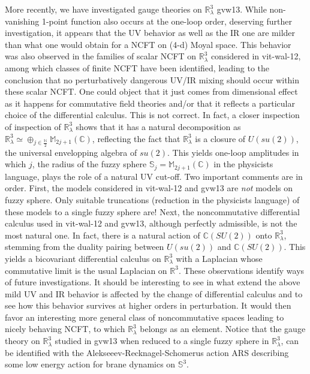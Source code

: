 \documentclass[10pt]{book}
\theoremstyle{break}
\begin{document}
More recently, we have investigated gauge theories on $\mathbb{R}^3_\lambda$ {gvw13}. While non-vanishing 1-point function also occurs at the one-loop order, deserving further investigation, it appears that the UV behavior as well as the IR one are milder than what one would obtain for a NCFT on (4-d) Moyal space. This behavior was also observed in the families of scalar NCFT on $\mathbb{R}^3_\lambda$ considered in {vit-wal-12}, among which classes of finite NCFT have been identified, leading to the conclusion that no perturbatively dangerous UV/IR mixing should occur within these scalar NCFT. One could object that it just comes from dimensional effect as it happens for commutative field theories and/or that it reflects a particular choice of the differential calculus. This is not correct. In fact, a closer inspection of inspection of $\mathbb{R}^3_\lambda$ shows that it has a natural decomposition as $\mathbb{R}^3_\lambda\simeq\oplus_{j\in\frac{\mathbb{N}}{2}}\mathbb{M}_{2j+1}(\mathbb{C})$, 
reflecting the fact that $\mathbb{R}^3_\lambda$  is a closure of $U(su(2))$, the universal envelopping algebra of $su(2)$. This yields one-loop amplitudes in which $j$, the radius of the fuzzy sphere $\mathbb{S}_j=\mathbb{M}_{2j+1}(\mathbb{C})$ in the physicists language, plays the role of a natural UV cut-off. Two important comments are in order. First, the models considered in {vit-wal-12} and {gvw13} are {\it{not}} models on fuzzy sphere. Only suitable truncations (reduction in the physicists language) of these models to a single fuzzy sphere are! Next, the noncommutative differential calculus used in {vit-wal-12} and {gvw13}, although perfectly admissible, is not the most natural one. In fact, there is a natural action of $\mathbb{C}(SU(2))$ onto $\mathbb{R}^3_\lambda$, stemming from the duality pairing between $U(su(2))$ and $\mathbb{C}(SU(2))$. This yields a bicovariant differential calculus on $\mathbb{R}^3_\lambda$ with a Laplacian whose commutative limit is the usual Laplacian on 
$\mathbb{R}^3$. These observations identify ways of future investigations. It should be interesting to see in what extend the above mild UV and IR behavior is affected by the change of differential calculus and to see how this behavior survives at higher orders in perturbation. It would then favor an interesting more general class of noncommutative spaces leading to nicely behaving NCFT, to which $\mathbb{R}^3_\lambda$ belongs as an element. Notice that the gauge theory on $\mathbb{R}^3_\lambda$ studied in {gvw13} when reduced to a single fuzzy sphere in $\mathbb{R}^3_\lambda$, can be identified with the Alekseeev-Recknagel-Schomerus action {ARS} describing some low energy action for brane dynamics on $\mathbb{S}^3$.
\end{document}
